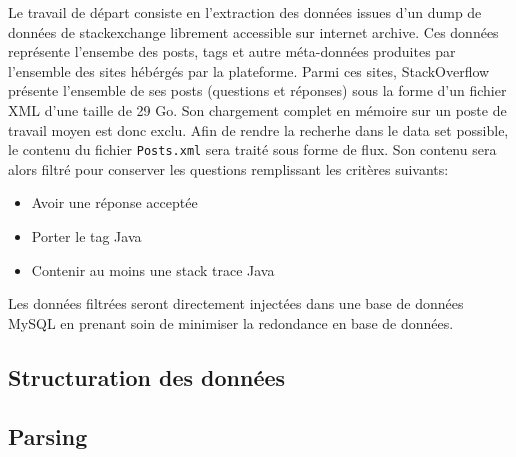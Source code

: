 \documentclass[11pt,a4paper]{article}
\begin{document}
Le travail de départ consiste en l'extraction des données issues d'un dump de données de stackexchange librement accessible sur internet archive\cite{so-dump}.
Ces données représente l'ensembe des posts, tags et autre méta-données produites par l'ensemble des sites hébérgés par la plateforme.
Parmi ces sites, StackOverflow présente l'ensemble de ses posts (questions et réponses) sous la forme d'un fichier XML d'une taille de 29 Go.
Son chargement complet en mémoire sur un poste de travail moyen est donc exclu.
Afin de rendre la recherhe dans le data set possible, le contenu du fichier \texttt{Posts.xml} sera traité sous forme de flux.
Son contenu sera alors filtré pour conserver les questions remplissant les critères suivants:
\begin{itemize}
	\item Avoir une réponse acceptée
	\item Porter le tag Java
	\item Contenir au moins une stack trace Java
\end{itemize}
Les données filtrées seront directement injectées dans une base de données MySQL en prenant soin de minimiser la redondance en base de données.
\subsection{Structuration des données}
\subsection{Parsing}


\end{document}
